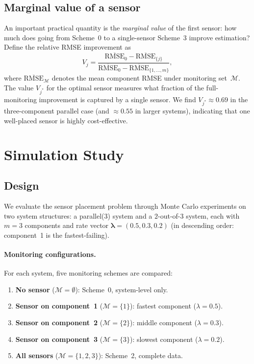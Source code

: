\documentclass[12pt]{article}
\theoremstyle{definition}
\theoremstyle{remark}
\newcommand{\blam}{\boldsymbol{\lambda}}
\begin{document}
\subsection{Marginal value of a sensor}
\label{sec:marginal-value}

An important practical quantity is the \emph{marginal value} of the
first sensor: how much does going from Scheme~0 to a single-sensor
Scheme~3 improve estimation?  Define the relative RMSE improvement as
\begin{equation}\label{eq:marginal-value}
  V_j = \frac{\overline{\mathrm{RMSE}}_0 -
  \overline{\mathrm{RMSE}}_{\{j\}}}
  {\overline{\mathrm{RMSE}}_0 - \overline{\mathrm{RMSE}}_{\{1,\ldots,m\}}},
\end{equation}
where $\overline{\mathrm{RMSE}}_\mathcal{M}$ denotes the mean
component RMSE under monitoring set~$\mathcal{M}$.  The value
$V_{j^*}$ for the optimal sensor measures what fraction of the
full-monitoring improvement is captured by a single sensor.  We find
$V_{j^*} \approx 0.69$ in the three-component parallel case (and
$\approx 0.55$ in larger systems), indicating that one well-placed
sensor is highly cost-effective.


\section{Simulation Study}
\label{sec:simulations}

\subsection{Design}
\label{sec:sim-design}

We evaluate the sensor placement problem through Monte Carlo
experiments on two system structures: a parallel($3$) system and a
$2$-out-of-$3$ system, each with $m = 3$ components and rate vector
$\blam = (0.5, 0.3, 0.2)$ (in descending order: component~1 is the
fastest-failing).

\paragraph{Monitoring configurations.}
For each system, five monitoring schemes are compared:
\begin{enumerate}
  \item \textbf{No sensor} ($\mathcal{M} = \emptyset$): Scheme~0, system-level only.
  \item \textbf{Sensor on component~1} ($\mathcal{M} = \{1\}$): fastest component ($\lambda = 0.5$).
  \item \textbf{Sensor on component~2} ($\mathcal{M} = \{2\}$): middle component ($\lambda = 0.3$).
  \item \textbf{Sensor on component~3} ($\mathcal{M} = \{3\}$): slowest component ($\lambda = 0.2$).
  \item \textbf{All sensors} ($\mathcal{M} = \{1, 2, 3\}$): Scheme~2, complete data.
\end{enumerate}
\end{document}
